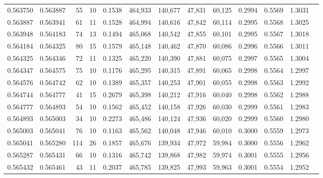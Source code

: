 \begin{tabular}{rrrrrrrrrrrrr}
0.563750 & 0.563887 &    55 &  10 &                                     0.1538 & 464,933 & 140,677 &  47,831 &  60,125 & 0.2994 & 0.5569 & 1.3031 \\
0.563887 & 0.563941 &    61 &  11 &                                     0.1528 & 464,994 & 140,616 &  47,842 &  60,114 & 0.2995 & 0.5568 & 1.3025 \\
0.563948 & 0.564183 &    74 &  13 &                                     0.1494 & 465,068 & 140,542 &  47,855 &  60,101 & 0.2995 & 0.5567 & 1.3018 \\
0.564184 & 0.564325 &    80 &  15 &                                     0.1579 & 465,148 & 140,462 &  47,870 &  60,086 & 0.2996 & 0.5566 & 1.3011 \\
0.564325 & 0.564346 &    72 &  11 &                                     0.1325 & 465,220 & 140,390 &  47,881 &  60,075 & 0.2997 & 0.5565 & 1.3004 \\
0.564347 & 0.564575 &    75 &  10 &                                     0.1176 & 465,295 & 140,315 &  47,891 &  60,065 & 0.2998 & 0.5564 & 1.2997 \\
0.564576 & 0.564742 &    62 &  10 &                                     0.1389 & 465,357 & 140,253 &  47,901 &  60,055 & 0.2998 & 0.5563 & 1.2992 \\
0.564744 & 0.564777 &    41 &  15 &                                     0.2679 & 465,398 & 140,212 &  47,916 &  60,040 & 0.2998 & 0.5562 & 1.2988 \\
0.564777 & 0.564893 &    54 &  10 &                                     0.1562 & 465,452 & 140,158 &  47,926 &  60,030 & 0.2999 & 0.5561 & 1.2983 \\
0.564893 & 0.565003 &    34 &  10 &                                     0.2273 & 465,486 & 140,124 &  47,936 &  60,020 & 0.2999 & 0.5560 & 1.2980 \\
0.565003 & 0.565041 &    76 &  10 &                                     0.1163 & 465,562 & 140,048 &  47,946 &  60,010 & 0.3000 & 0.5559 & 1.2973 \\
0.565041 & 0.565280 &   114 &  26 &                                     0.1857 & 465,676 & 139,934 &  47,972 &  59,984 & 0.3000 & 0.5556 & 1.2962 \\
0.565287 & 0.565431 &    66 &  10 &                                     0.1316 & 465,742 & 139,868 &  47,982 &  59,974 & 0.3001 & 0.5555 & 1.2956 \\
0.565432 & 0.565461 &    43 &  11 &                                     0.2037 & 465,785 & 139,825 &  47,993 &  59,963 & 0.3001 & 0.5554 & 1.2952 \\

\end{tabular}
